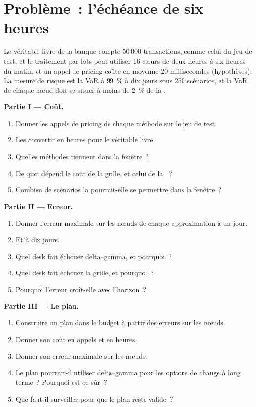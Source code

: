 \section{Problème~: l'échéance de six heures}

\begin{problem}\label{pb:rc:build-a-risk-engine:1}
Le véritable livre de la banque compte 50\,000 transactions, comme celui du jeu de test, et le traitement par lots peut utiliser 16 cœurs de deux
heures à six heures du matin, et un appel de pricing coûte en moyenne 20 millisecondes (hypothèses). La mesure de risque est la VaR à 99~\% à
dix jours sous 250 scénarios, et la VaR de chaque nœud doit se situer à moins de 2~\% de la .

\medskip\noindent\textbf{Partie I --- Coût.}
\begin{enumerate}
\item Donner les appels de pricing de chaque méthode sur le jeu de test.
\item Les convertir en heures pour le véritable livre.
\item Quelles méthodes tiennent dans la fenêtre~?
\item De quoi dépend le coût de la grille, et celui de la ~?
\item Combien de scénarios la  pourrait-elle se permettre dans la fenêtre~?
\end{enumerate}

\medskip\noindent\textbf{Partie II --- Erreur.}
\begin{enumerate}[resume]
\item Donner l'erreur maximale sur les nœuds de chaque approximation à un jour.
\item Et à dix jours.
\item Quel desk fait échouer delta--gamma, et pourquoi~?
\item Quel desk fait échouer la grille, et pourquoi~?
\item Pourquoi l'erreur croît-elle avec l'horizon~?
\end{enumerate}

\medskip\noindent\textbf{Partie III --- Le plan.}
\begin{enumerate}[resume]
\item Construire un plan dans le budget à partir des erreurs sur les nœuds.
\item Donner son coût en appels et en heures.
\item Donner son erreur maximale sur les nœuds.
\item Le plan pourrait-il utiliser delta--gamma pour les options de change à long terme~? Pourquoi est-ce sûr~?
\item Que faut-il surveiller pour que le plan reste valide~?
\end{enumerate}


\end{problem}
